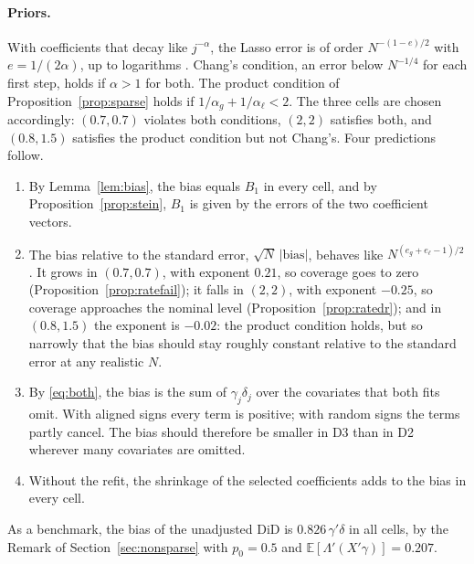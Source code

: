 \documentclass[11pt]{article}
\providecommand{\E}{\mathbb{E}}
\newenvironment{ins}{\begin{leftbar}}{\end{leftbar}}
\theoremstyle{plain}
\theoremstyle{remark}
\begin{document}
\begin{ins}
\paragraph{Priors.} With coefficients that decay like $j^{-\alpha}$, the Lasso
error is of order $N^{-(1-e)/2}$ with $e=1/(2\alpha)$, up to logarithms
\parencite[Example~10]{smucler2019unifying}. Chang's condition, an error below
$N^{-1/4}$ for each first step, holds if $\alpha>1$ for both. The product
condition of Proposition~\ref{prop:sparse} holds if
$1/\alpha_g+1/\alpha_\ell<2$. The three cells are chosen accordingly:
$(0.7,0.7)$ violates both conditions, $(2,2)$ satisfies both, and $(0.8,1.5)$
satisfies the product condition but not Chang's. Four predictions follow.
\begin{enumerate}
\item By Lemma~\ref{lem:bias}, the bias equals $B_1$ in every cell, and by
  Proposition~\ref{prop:stein}, $B_1$ is given by the errors of the two
  coefficient vectors.
\item The bias relative to the standard error, $\sqrt N\,|\text{bias}|$, behaves
  like $N^{(e_g+e_\ell-1)/2}$. It grows in $(0.7,0.7)$, with exponent $0.21$,
  so coverage goes to zero (Proposition~\ref{prop:ratefail}); it falls in
  $(2,2)$, with exponent $-0.25$, so coverage approaches the nominal level
  (Proposition~\ref{prop:ratedr}); and in $(0.8,1.5)$ the exponent is $-0.02$:
  the product condition holds, but so narrowly that the bias should stay
  roughly constant relative to the standard error at any realistic $N$.
\item By \eqref{eq:both}, the bias is the sum of $\gamma_j\delta_j$ over the
  covariates that both fits omit. With aligned signs every term is positive;
  with random signs the terms partly cancel. The bias should therefore be
  smaller in D3 than in D2 wherever many covariates are omitted.
\item Without the refit, the shrinkage of the selected coefficients adds to the
  bias in every cell.
\end{enumerate}
As a benchmark, the bias of the unadjusted DiD is $0.826\,\gamma'\delta$ in all
cells, by the Remark of Section~\ref{sec:nonsparse} with $p_0=0.5$ and
$\E[\Lambda'(X'\gamma)]=0.207$.

\end{ins}
\begin{table}[ht]
\centering\footnotesize
\setlength{\tabcolsep}{3pt}

\caption{D2 (aligned signs) and D3 (random signs): bias and coverage of the
nominal 95\% interval of DML-DiD, $R=500$, $\theta_0=1$. $\gamma'\delta$ and the
bias of the unadjusted DiD are given for $N=4000$. ``Slope'' is the slope of
$\log(\sqrt N|\text{bias}|)$ on $\log N$ and its predicted value
$(e_g+e_\ell-1)/2$. The largest MCSE of a bias in the table is 0.006.}
\label{tab:d23}
\end{table}
\end{document}

